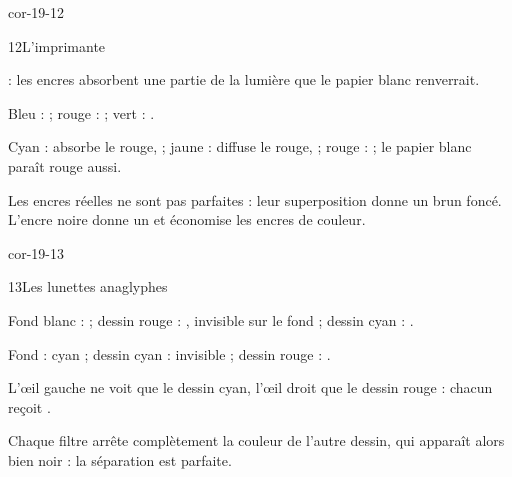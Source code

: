 \begin{blocLivre}{cor-19-12}
\begin{corrige}{12}{L'imprimante}
\begin{questions}
\item {} : les encres absorbent une partie de la lumière que le papier blanc renverrait.
\item Bleu :  ; rouge :  ; vert : .
\item Cyan : absorbe le rouge,  ; jaune : diffuse le rouge,  ; rouge :  ; le papier blanc paraît rouge aussi.
\item Les encres réelles ne sont pas parfaites : leur superposition donne un brun foncé. L'encre noire donne un  et économise les encres de couleur.
\end{questions}
\end{corrige}
\end{blocLivre}
\begin{blocLivre}{cor-19-13}
\begin{corrige}{13}{Les lunettes anaglyphes}
\begin{questions}
\item Fond blanc :  ; dessin rouge : , invisible sur le fond ; dessin cyan : .
\item Fond : cyan ; dessin cyan : invisible ; dessin rouge : .
\item L'œil gauche ne voit que le dessin cyan, l'œil droit que le dessin rouge : chacun reçoit .
\item Chaque filtre arrête complètement la couleur de l'autre dessin, qui apparaît alors bien noir : la séparation est parfaite.
\end{questions}
\end{corrige}
\end{blocLivre}
